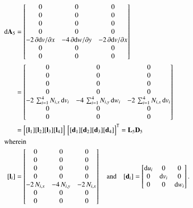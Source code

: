 \begin{subequations}
	\begin{align}
		\mathrm{d} \mathbf{A}_5 & =  \begin{bmatrix}
			0 & 0 &  0   \\
			0 &  0 & 0  \\
			0 &  0 & 0 \\
			0 &  0 & 0 \\
			- 2 \, \partial \mathrm{d} v / \partial x & - 4 \, \partial \mathrm{d} w / \partial y & - 2 \, \partial \mathrm{d} v / \partial x  \\
			0 &  0 & 0  \\
			0 &  0 & 0  \end{bmatrix} \notag\\
		& = \begin{bmatrix}
			0 & 0 &  0   \\
			0 &  0 & 0  \\
			0 &  0 & 0 \\
			0 &  0 & 0 \\
			- 2 \, \sum\nolimits_{i=1}^4 N_{i,x} \, \mathrm{d} v_i  & - 4 \, \sum\nolimits_{i=1}^4 N_{i,y} \, \mathrm{d} w_i  & - 2 \, \sum\nolimits_{i=1}^4 N_{i,x} \, \mathrm{d} v_i   \\
			0 &  0 & 0  \\
			0 &  0 & 0  \end{bmatrix} \notag \\	
		& = \begin{bmatrix}
			[\mathbf{l}_1] [\mathbf{l}_2] [\mathbf{l}_3] [\mathbf{l}_4] 
		\end{bmatrix}  \, \begin{bmatrix} [\mathbf{d}_1] [\mathbf{d}_2] [\mathbf{d}_3] [\mathbf{d}_4] \end{bmatrix}^{\mathsf{T}}
	= \mathbf{L}_5 \mathbf{D}_5 \\
		\intertext{wherein}
		[\mathbf{l}_i] & = \begin{bmatrix}
			0 & 0 &  0   \\
			0 &  0 & 0  \\
			0 &  0 & 0 \\
			0 &  0 & 0 \\
			- 2 \, N_{i,x}  & - 4 \,  N_{i,y}  & - 2 \, N_{i,x}  \\
			0 &  0 & 0  \\
			0 &  0 & 0  \end{bmatrix}    \quad \text{and} \quad	[\mathbf{d}_i] = \begin{bmatrix}
			\mathrm{d} u_i & 0  & 0  \\
			0 &  \mathrm{d} v_i   & 0  \\
			0 & 0 & \mathrm{d} w_i \end{bmatrix} .
	\end{align}
\end{subequations}

